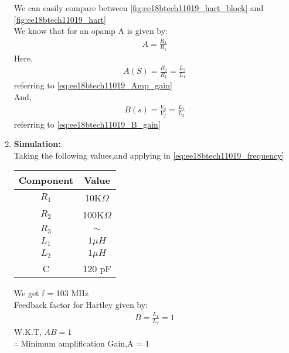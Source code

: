 \begin{enumerate}[label=\thesection.\arabic*.,ref=\thesection.\theenumi]
We can easily compare between \ref{fig:ee18btech11019_hart_block} and \ref{fig:ee18btech11019_hart}\\
We know that for an opamp A is given by:
\begin{align}
    A = \frac{R_2}{R_1}
\end{align}
Here,
\begin{align}
    A(S) = \frac{R_2}{R_1} = \frac{L_2}{L_1}
\end{align}
referring to \ref{eq:ee18btech11019_Amp_gain}\\
And,
\begin{align}
    B(s) = \frac{V_o}{V_f} = \frac{L_1}{L_2}
\end{align}
referring to \ref{eq:ee18btech11019_B_gain}\\
\newline
\item \textbf{Simulation:}\\
Taking the following values,and applying in \ref{eq:ee18btech11019_frequency} \\



\begin{tabular}{|c|c|}
\hline
Component & Value  \\
\hline
$R_1$         & 10K$\Omega$   \\
\hline
$R_2$         & 100K$\Omega$   \\
\hline
$R_3$         & $\sim$  \\
\hline
$L_1$         & $1 \mu H$     \\
\hline
$L_2$         & $1 \mu H$   \\
\hline
C         & 120 pF \\
\hline
\end{tabular}


We get f = 103 MHz\\
Feedback factor for Hartley given by:
\begin{align}
B =\frac{L_1}{L_2}= 1
\end{align}
W.K.T, $AB = 1$\\
$\therefore$ Minimum amplification Gain,A = 1\\
\end{enumerate}
